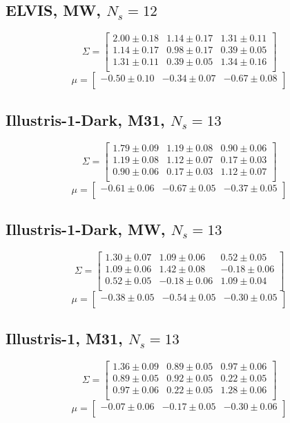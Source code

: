 \documentclass[a4paper,fleqn,usenatbib]{mnras}
\begin{document}
\subsection{ELVIS, MW, $N_s=12$}
\[
\Sigma=
\begin{bmatrix}
2.00 \pm 0.18 & 1.14 \pm 0.17 & 1.31 \pm 0.11\\
1.14 \pm 0.17 & 0.98 \pm 0.17 & 0.39 \pm 0.05\\
1.31 \pm 0.11 & 0.39 \pm 0.05 & 1.34 \pm 0.16\\
\end{bmatrix}
\]
\[
\mu=
\begin{bmatrix}
-0.50 \pm 0.10 & -0.34 \pm 0.07 & -0.67 \pm 0.08\\
\end{bmatrix}
\]

\subsection{Illustris-1-Dark, M31, $N_s=13$}
\[
\Sigma=
\begin{bmatrix}
1.79 \pm 0.09 & 1.19 \pm 0.08 & 0.90 \pm 0.06\\
1.19 \pm 0.08 & 1.12 \pm 0.07 & 0.17 \pm 0.03\\
0.90 \pm 0.06 & 0.17 \pm 0.03 & 1.12 \pm 0.07\\
\end{bmatrix}
\]
\[
\mu=
\begin{bmatrix}
-0.61 \pm 0.06 & -0.67 \pm 0.05 & -0.37 \pm 0.05\\
\end{bmatrix}
\]
\subsection{Illustris-1-Dark, MW, $N_s=13$}
\[
\Sigma=
\begin{bmatrix}
1.30 \pm 0.07 & 1.09 \pm 0.06 & 0.52 \pm 0.05\\
1.09 \pm 0.06 & 1.42 \pm 0.08 & -0.18 \pm 0.06\\
0.52 \pm 0.05 & -0.18 \pm 0.06 & 1.09 \pm 0.04\\
\end{bmatrix}
\]
\[
\mu=
\begin{bmatrix}
-0.38 \pm 0.05 & -0.54 \pm 0.05 & -0.30 \pm 0.05\\
\end{bmatrix}
\]

\subsection{Illustris-1, M31, $N_s=13$}
\[
\Sigma=
\begin{bmatrix}
1.36 \pm 0.09 & 0.89 \pm 0.05 & 0.97 \pm 0.06\\
0.89 \pm 0.05 & 0.92 \pm 0.05 & 0.22 \pm 0.05\\
0.97 \pm 0.06 & 0.22 \pm 0.05 & 1.28 \pm 0.06\\
\end{bmatrix}
\]
\[
\mu=
\begin{bmatrix}
-0.07 \pm 0.06 & -0.17 \pm 0.05 & -0.30 \pm 0.06\\
\end{bmatrix}
\]
\end{document}
